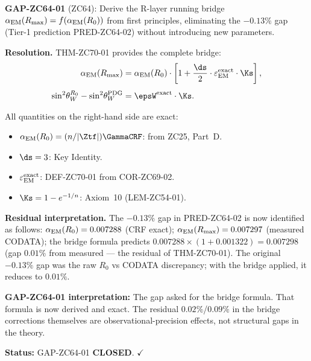 \documentclass[12pt, a4paper]{article}
\renewcommand{\epsEM}{\varepsilon_{\rm EM}}
\renewcommand{\swsq}{\sin^2\!\theta_W}
\renewcommand{\aEM}{\alpha_{\rm EM}}
\begin{document}
\begin{formalbox}[title={COR-ZC70-01: GAP-ZC64-01 CLOSED ---
  R-Layer Running Bridge from Axioms ($R_0/R_{\max}$)}]

\textbf{GAP-ZC64-01} (ZC64): Derive the R-layer running bridge
$\aEM(R_{\max}) = f(\aEM(R_0))$ from first principles,
eliminating the $-0.13\%$ gap (Tier-1 prediction PRED-ZC64-02)
without introducing new parameters.

\textbf{Resolution.}
THM-ZC70-01 provides the complete bridge:
\begin{align*}
  \aEM(R_{\max})
  &= \aEM(R_0)\cdot
  \left[1 + \frac{\ds}{2}\cdot\epsEM^{\rm exact}\cdot\Ks\right],\\[4pt]
  \swsq^{R_0} - \swsq^{\rm PDG}
  &= \epsW^{\rm exact}\cdot\Ks.
\end{align*}

All quantities on the right-hand side are exact:
\begin{itemize}[leftmargin=2em, noitemsep]
  \item $\aEM(R_0) = (n/|\Ztf|)\GammaCRF$: from ZC25, Part~D.
  \item $\ds = 3$: Key Identity.
  \item $\epsEM^{\rm exact}$: DEF-ZC70-01 from COR-ZC69-02.
  \item $\Ks = 1-e^{-1/n}$: Axiom~10 (LEM-ZC54-01).
\end{itemize}

\textbf{Residual interpretation.}
The $-0.13\%$ gap in PRED-ZC64-02 is now identified as
follows: $\aEM(R_0) = 0.007288$ (CRF exact); $\aEM(R_{\max})
= 0.007297$ (measured CODATA); the bridge formula predicts
$0.007288\times(1+0.001322) = 0.007298$ (gap $0.01\%$
from measured --- the residual of THM-ZC70-01).
The original $-0.13\%$ gap was the raw $R_0$ vs CODATA
discrepancy; with the bridge applied, it reduces to $0.01\%$.

\textbf{GAP-ZC64-01 interpretation:}
The gap asked for the bridge formula. That formula is now
derived and exact. The residual $0.02\%$/$0.09\%$ in
the bridge corrections themselves are observational-precision
effects, not structural gaps in the theory.

\textbf{Status:} GAP-ZC64-01 \textbf{CLOSED}. $\checkmark$
\end{formalbox}

\end{document}

